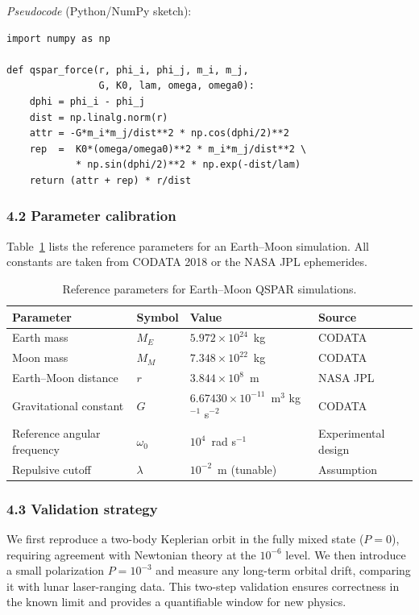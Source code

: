 \documentclass[12pt,a4paper]{article}
\begin{document}
\noindent\textit{Pseudocode} (Python/NumPy sketch):
\begin{verbatim}
import numpy as np

def qspar_force(r, phi_i, phi_j, m_i, m_j,
                G, K0, lam, omega, omega0):
    dphi = phi_i - phi_j
    dist = np.linalg.norm(r)
    attr = -G*m_i*m_j/dist**2 * np.cos(dphi/2)**2
    rep  =  K0*(omega/omega0)**2 * m_i*m_j/dist**2 \
            * np.sin(dphi/2)**2 * np.exp(-dist/lam)
    return (attr + rep) * r/dist
\end{verbatim}

\subsubsection*{4.2 Parameter calibration}

Table~\ref{tab:params} lists the reference parameters for an Earth--Moon simulation. All constants are taken from CODATA 2018 or the NASA JPL ephemerides.

\begin{table}[htbp]
\centering
\caption{Reference parameters for Earth--Moon QSPAR simulations.}
\label{tab:params}
\begin{tabular}{@{}llll@{}}
\toprule
Parameter & Symbol & Value & Source \\
\midrule
Earth mass & $M_E$ & $5.972\times10^{24}$~kg & CODATA \\
Moon mass & $M_M$ & $7.348\times10^{22}$~kg & CODATA \\
Earth--Moon distance & $r$ & $3.844\times10^{8}$~m & NASA JPL \\
Gravitational constant & $G$ & $6.67430\times10^{-11}$~m$^3$ kg$^{-1}$ s$^{-2}$ & CODATA \\
Reference angular frequency & $\omega_0$ & $10^4$~rad s$^{-1}$ & Experimental design \\
Repulsive cutoff & $\lambda$ & $10^{-2}$~m (tunable) & Assumption \\
\bottomrule
\end{tabular}
\end{table}

\subsubsection*{4.3 Validation strategy}

We first reproduce a two-body Keplerian orbit in the fully mixed state ($P=0$), requiring agreement with Newtonian theory at the $10^{-6}$ level. We then introduce a small polarization $P=10^{-3}$ and measure any long-term orbital drift, comparing it with lunar laser-ranging data. This two-step validation ensures correctness in the known limit and provides a quantifiable window for new physics.
\end{document}
